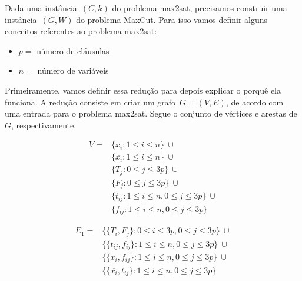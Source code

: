 		Dada uma instância~$(C,k)$ do problema {\sc max2sat}, 
		precisamos construir uma instância~$(G,W)$
		do problema MaxCut.
		Para isso vamos definir alguns conceitos referentes
		ao problema {\sc max2sat}:
		\begin{itemize}
			\item $p = $ número de cláusulas
			\item $n = $ número de variáveis
		\end{itemize}

		Primeiramente, vamos definir essa redução para depois
		explicar o porquê ela funciona.
		A redução consiste em criar um grafo~$G=(V,E)$, de 
		acordo com uma entrada para o problema {\sc max2sat}.
		Segue o conjunto de vértices e arestas de~$G$, 
		respectivamente.
		
		\begin{align}
			V =  &\{x_i: 1\le i\le n\} \ \cup \nonumber\\
				&\{\overline{x_i}: 1\le i\le n\} \ \cup\nonumber\\ 
				&\{T_j: 0\le j\le 3p\} \ \cup \nonumber\\
				&\{F_j: 0\le j\le 3p\} \ \cup \nonumber\\
				&\{t_{ij}: 1\le i\le n, 0\le j\le 3p\} 
					\ \cup \nonumber\\
				&\{f_{ij}: 1\le i\le n, 0\le j\le 3p\}\nonumber
		\end{align}

		\begin{align}
			E_1=&\{ \{T_i,F_j\}: 0\le i\le 3p, 0\le j\le 3p\}\ \cup 
					\nonumber\\
				&\{\{t_{ij}, f_{ij}\}: 1\le i\le n, 
					0\le j\le 3p\}\ \cup \nonumber \\
				&\{\{x_i, f_{ij}\}: 1\le i\le n, 
					0\le j\le 3p\} \ \cup \nonumber \\
				&\{\{\overline{x_i}, t_{ij}\}: 1\le 
					i\le n, 0\le j\le 3p\} \nonumber
		\end{align}


